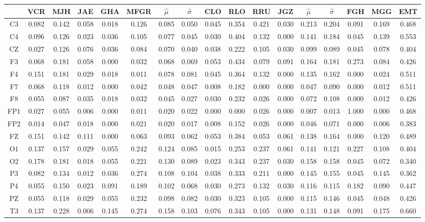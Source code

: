 \documentclass[12pt,a4paper]{mitthesis}
\begin{document}
\begin{SidewaysFigure}
\centering
\begin{tabular}{c||ccccc|cc||cccc|cc||ccc}
& VCR & MJH & JAE & GHA & MFGR &$\widehat{\mu}$ & $\widehat{\sigma}$
& CLO & RLO & RRU & JGZ &$\widehat{\mu}$ & $\widehat{\sigma}$
& FGH & MGG & EMT \\
\hline
C3&0.082&0.142&0.058&0.018&0.126&0.085&0.050&0.045&0.354&0.421&0.030&0.213&0.204&0.091&0.169&0.468 \\
C4&0.096&0.126&0.023&0.036&0.105&0.077&0.045&0.030&0.404&0.132&0.000&0.141&0.184&0.045&0.139&0.553 \\
CZ&0.027&0.126&0.076&0.036&0.084&0.070&0.040&0.038&0.222&0.105&0.030&0.099&0.089&0.045&0.078&0.404 \\
F3&0.068&0.181&0.058&0.000&0.032&0.068&0.069&0.053&0.434&0.079&0.091&0.164&0.181&0.273&0.084&0.426 \\
F4&0.151&0.181&0.029&0.018&0.011&0.078&0.081&0.045&0.364&0.132&0.000&0.135&0.162&0.000&0.024&0.511 \\
F7&0.068&0.118&0.012&0.000&0.042&0.048&0.047&0.008&0.182&0.000&0.000&0.047&0.090&0.000&0.012&0.511 \\
F8&0.055&0.087&0.035&0.018&0.032&0.045&0.027&0.030&0.232&0.026&0.000&0.072&0.108&0.000&0.012&0.426 \\
FP1&0.027&0.055&0.006&0.000&0.011&0.020&0.022&0.000&0.000&0.026&0.000&0.007&0.013&1.000&0.000&0.468 \\
FP2&0.014&0.047&0.018&0.000&0.021&0.020&0.017&0.008&0.152&0.026&0.000&0.046&0.071&0.000&0.006&0.383 \\
FZ&0.151&0.142&0.111&0.000&0.063&0.093&0.062&0.053&0.384&0.053&0.061&0.138&0.164&0.000&0.120&0.489 \\
O1&0.137&0.157&0.029&0.055&0.242&0.124&0.085&0.015&0.253&0.237&0.061&0.141&0.121&0.227&0.108&0.404 \\
O2&0.178&0.181&0.018&0.055&0.221&0.130&0.089&0.023&0.343&0.237&0.030&0.158&0.158&0.045&0.072&0.340 \\
P3&0.082&0.134&0.012&0.036&0.274&0.108&0.104&0.038&0.333&0.211&0.000&0.145&0.155&0.045&0.145&0.362 \\
P4&0.055&0.150&0.023&0.091&0.189&0.102&0.068&0.030&0.273&0.132&0.030&0.116&0.115&0.182&0.090&0.447 \\
PZ&0.055&0.118&0.029&0.055&0.232&0.098&0.082&0.030&0.323&0.105&0.000&0.115&0.146&0.045&0.048&0.426 \\
T3&0.137&0.228&0.006&0.145&0.274&0.158&0.103&0.076&0.343&0.105&0.000&0.131&0.148&0.091&0.175&0.660 \\

\end{tabular}
\end{SidewaysFigure}
\end{document}
